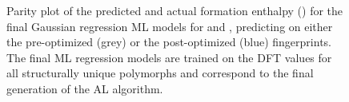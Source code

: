 \begin{figure}[!htb]
\centering
{}
\caption{\label{fig:parity}
%
Parity plot of the predicted and actual formation enthalpy (\DHf) for the final Gaussian regression ML models for \IrOtwo and \IrOthree,
predicting on either the pre-optimized (grey) or the post-optimized (blue) fingerprints.
%
The final ML regression models are trained on the DFT
\DHf values for all structurally unique polymorphs and correspond to the final generation of the AL algorithm.
}
\end{figure}
